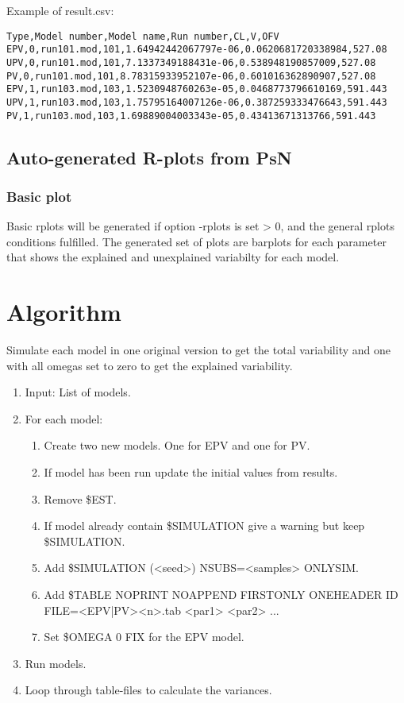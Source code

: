 Example of result.csv:
\begin{verbatim}
Type,Model number,Model name,Run number,CL,V,OFV
EPV,0,run101.mod,101,1.64942442067797e-06,0.0620681720338984,527.08
UPV,0,run101.mod,101,7.1337349188431e-06,0.538948190857009,527.08
PV,0,run101.mod,101,8.78315933952107e-06,0.601016362890907,527.08
EPV,1,run103.mod,103,1.5230948760263e-05,0.0468773796610169,591.443
UPV,1,run103.mod,103,1.75795164007126e-06,0.387259333476643,591.443
PV,1,run103.mod,103,1.69889004003343e-05,0.43413671313766,591.443
\end{verbatim}

\subsection{Auto-generated R-plots from PsN}
\newcommand{\rplotsconditions}{The default pvar template requires no extra R libraries.}


\subsubsection*{Basic plot}
Basic rplots will be generated if option -rplots is set > 0, and the general rplots conditions fulfilled. The generated set of plots are barplots for each parameter that shows the explained and unexplained variabilty for each model.


\section{Algorithm}

Simulate each model in one original version to get the total variability and one with all omegas set to zero to get the explained variability.

\begin{enumerate}
	\item Input: List of models.
	\item For each model:
	\begin{enumerate}
		\item Create two new models. One for EPV and one for PV.
		\item If model has been run update the initial values from results.
		\item Remove \$EST.
		\item If model already contain \$SIMULATION give a warning but keep \$SIMULATION.
		\item Add \$SIMULATION (<seed>) NSUBS=<samples> ONLYSIM.
		\item Add \$TABLE NOPRINT NOAPPEND FIRSTONLY ONEHEADER ID FILE=<EPV|PV><n>.tab <par1> <par2> ...
		\item Set \$OMEGA 0 FIX for the EPV model.
	\end{enumerate}
	\item Run models.
	\item Loop through table-files to calculate the variances.
\end{enumerate}




